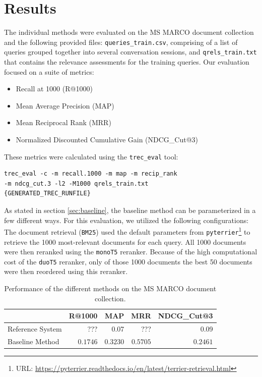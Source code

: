 \documentclass[sigconf]{acmart}
\begin{document}
\section{Results}\label{sec:results}
The individual methods were evaluated on the MS MARCO document collection and the following provided files: \texttt{queries\_train.csv}, comprising of a list of queries grouped together into several conversation sessions, and \texttt{qrels\_train.txt} that contains the relevance assessments for the training queries. Our evaluation focused on a suite of metrics:
\begin{itemize}
	\item	Recall at 1000 (R@1000)
	\item	Mean Average Precision (MAP)
	\item	Mean Reciprocal Rank (MRR)
	\item	Normalized Discounted Cumulative Gain (NDCG\_Cut@3)
\end{itemize}
These metrics were calculated using the \texttt{trec\_eval} tool:
\begin{verbatim}
trec_eval -c -m recall.1000 -m map -m recip_rank
-m ndcg_cut.3 -l2 -M1000 qrels_train.txt
{GENERATED_TREC_RUNFILE}
\end{verbatim}

As stated in section \ref{sec:baseline}, the baseline method can be parameterized in a few different ways. For this evaluation, we utilized the following configurations: The document retrieval (\texttt{BM25}) used the default parameters from \texttt{pyterrier}\footnote{URL: \url{https://pyterrier.readthedocs.io/en/latest/terrier-retrieval.html}} to retrieve the 1000 most-relevant documents for each query. All 1000 documents were then reranked using the \texttt{monoT5} reranker. Because of the high computational cost of the \texttt{duoT5} reranker, only of those 1000 documents the best 50 documents were then reordered using this reranker.

\begin{table}[h]
\begin{center}
	\caption{Performance of the different methods on the MS MARCO document collection.}
	\begin{tabular}{l|rrrr}
			& R@1000 & MAP & MRR & NDCG\_Cut@3 \\
		\hline
		Reference System & ??? & 0.07 & ??? & 0.09 \\
		Baseline Method & $0.1746$ & $0.3230$ & $0.5705$ & $0.2461$ \\
	\end{tabular}
	\label{table:1}
\end{center}
\end{table}
\end{document}
